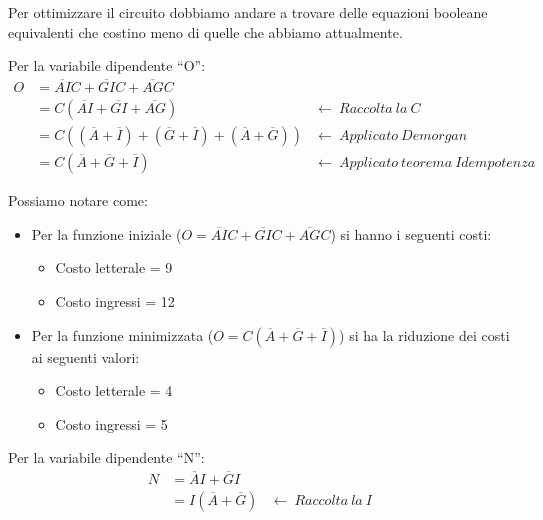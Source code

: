\begin{questions}
\begin{solution}
            \newpage
            
            Per ottimizzare il circuito dobbiamo andare a trovare delle equazioni booleane equivalenti che costino meno di quelle che abbiamo attualmente.\\
            
            \vspace{-0.5em}
                        
            Per la variabile dipendente ``O'':\\
            \vspace{-1em}
            \begin{align}
            	O & = \overline{AI}C +  \overline{GI}C + \overline{AG}C \\            	
            	& = C(\overline{AI} +  \overline{GI} + \overline{AG})  &←~Raccolta~la~C\\            	
            	& = C((\overline{A} + \overline{I}) +(\overline{G} + \overline{I}) + (\overline{A} + \overline{G})) &←~Applicato~Demorgan\\            	
            	& = C(\overline{A} + \overline{G} + \overline{I}) &←~Applicato~teorema~Idempotenza
            \end{align}
            
            Possiamo notare come:
            \begin{itemize}
            	\item Per la funzione iniziale ($O = \overline{AI}C +  \overline{GI}C + \overline{AG}C$) si hanno i seguenti costi:
            	\begin{itemize}
            		\item Costo letterale = 9
            		\item Costo ingressi = 12
            	\end{itemize}
            	
            	\item Per la funzione minimizzata ($O = C(\overline{A} + \overline{G} + \overline{I})$) si ha la riduzione dei costi ai seguenti valori:
				\begin{itemize}
					\item Costo letterale = 4
					\item Costo ingressi = 5
				\end{itemize}
			\end{itemize}

            Per la variabile dipendente ``N'':\\
            \vspace{-1em}
			\begin{align}
				N &= \overline{A}I + \overline{G}I\\
				& = I(\overline{A} + \overline{G}) &←~Raccolta~la~I            	
			\end{align}   
			

\end{solution}
\end{questions}
